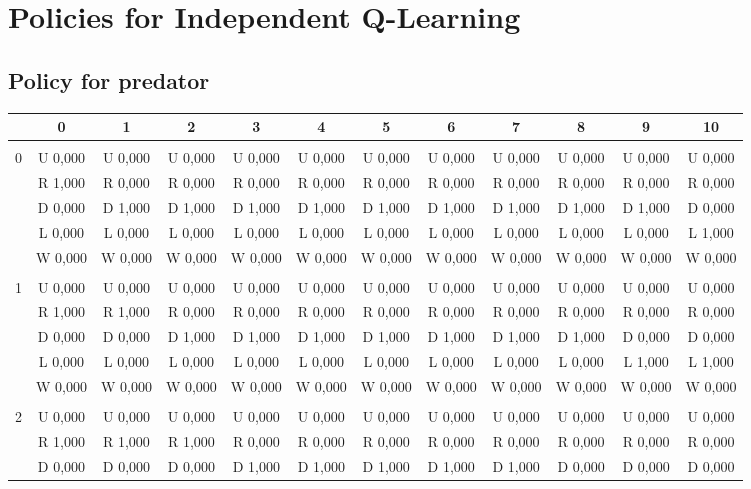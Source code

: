 \clearpage
\section{Policies for Independent Q-Learning} \label{app:policiesIQL}
\subsection{Policy for predator}
 \begin{table}[htbp]
\centering
\begin{tiny}
\begin{tabular}{c|c|c|c|c|c|c|c|c|c|c|c|}
&0&1&2&3&4&5&6&7&8&9&10\\ \hline\\
0&U 0,000&U 0,000&U 0,000&U 0,000&U 0,000&U 0,000&U 0,000&U 0,000&U 0,000&U 0,000&U 0,000\\
&R 1,000&R 0,000&R 0,000&R 0,000&R 0,000&R 0,000&R 0,000&R 0,000&R 0,000&R 0,000&R 0,000\\
&D 0,000&D 1,000&D 1,000&D 1,000&D 1,000&D 1,000&D 1,000&D 1,000&D 1,000&D 1,000&D 0,000\\
&L 0,000&L 0,000&L 0,000&L 0,000&L 0,000&L 0,000&L 0,000&L 0,000&L 0,000&L 0,000&L 1,000\\
&W 0,000&W 0,000&W 0,000&W 0,000&W 0,000&W 0,000&W 0,000&W 0,000&W 0,000&W 0,000&W 0,000\\
\hline \\
1&U 0,000&U 0,000&U 0,000&U 0,000&U 0,000&U 0,000&U 0,000&U 0,000&U 0,000&U 0,000&U 0,000\\
&R 1,000&R 1,000&R 0,000&R 0,000&R 0,000&R 0,000&R 0,000&R 0,000&R 0,000&R 0,000&R 0,000\\
&D 0,000&D 0,000&D 1,000&D 1,000&D 1,000&D 1,000&D 1,000&D 1,000&D 1,000&D 0,000&D 0,000\\
&L 0,000&L 0,000&L 0,000&L 0,000&L 0,000&L 0,000&L 0,000&L 0,000&L 0,000&L 1,000&L 1,000\\
&W 0,000&W 0,000&W 0,000&W 0,000&W 0,000&W 0,000&W 0,000&W 0,000&W 0,000&W 0,000&W 0,000\\
\hline \\
2&U 0,000&U 0,000&U 0,000&U 0,000&U 0,000&U 0,000&U 0,000&U 0,000&U 0,000&U 0,000&U 0,000\\
&R 1,000&R 1,000&R 1,000&R 0,000&R 0,000&R 0,000&R 0,000&R 0,000&R 0,000&R 0,000&R 0,000\\
&D 0,000&D 0,000&D 0,000&D 1,000&D 1,000&D 1,000&D 1,000&D 1,000&D 0,000&D 0,000&D 0,000\\

\end{tabular}
\end{tiny}
\end{table}
